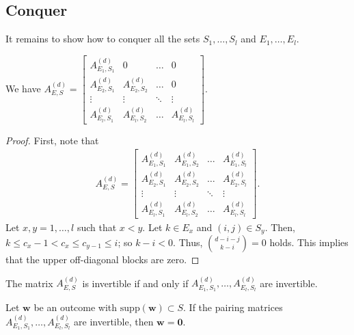 \subsection*{Conquer}

It remains to show how to conquer all the sets \( S_1, \dots, S_l \) and \( E_1, \dots, E_l \).

\begin{proposition}
    We have \( A_{E,S}^{(d)} = 
    \begin{bmatrix}
        A_{E_1,S_1}^{(d)} & 0 & \dots & 0 \\
        A_{E_2,S_1}^{(d)} & A_{E_2,S_2}^{(d)} & \dots & 0 \\
        \vdots & \vdots & \ddots & \vdots \\
        A_{E_l,S_1}^{(d)} & A_{E_l,S_2}^{(d)} & \dots & A_{E_l,S_l}^{(d)}
    \end{bmatrix} \).
\end{proposition}

\begin{proof}
    First, note that 
    \begin{align*}
        A_{E,S}^{(d)} = 
        \begin{bmatrix}
            A_{E_1,S_1}^{(d)} & A_{E_1,S_2}^{(d)} & \dots & A_{E_1,S_l}^{(d)} \\
            A_{E_2,S_1}^{(d)} & A_{E_2,S_2}^{(d)} & \dots & A_{E_2,S_l}^{(d)} \\
            \vdots & \vdots & \ddots & \vdots \\
            A_{E_l,S_1}^{(d)} & A_{E_l,S_2}^{(d)} & \dots & A_{E_l,S_l}^{(d)}
        \end{bmatrix}.
    \end{align*}
    Let \( x,y = 1, \dots , l \) such that \( x < y \). Let \( k \in E_x \) and \( (i,j) \in S_y \).
    Then, \( k \leq c_x - 1 < c_x \leq c_{y - 1} \leq i \); so \( k - i < 0 \). Thus, \( \binom{d-i-j}{k-i} = 0 \) holds. This implies that the upper off-diagonal blocks are zero.
\end{proof}

\begin{corollary}
    The matrix \( A^{(d)}_{E,S} \) is invertible if and only if \( A^{(d)}_{E_1,S_1}, \dots,  A^{(d)}_{E_l,S_l} \) are invertible.
\end{corollary}

\begin{corollary}
    Let \( \mathbf{w} \) be an outcome with \( \mathrm{supp}(\mathbf w) \subset S \).
    If the pairing matrices \( A^{(d)}_{E_1,S_1}, \dots,  A^{(d)}_{E_l,S_l} \) are invertible, then \( \mathbf{w} = \mathbf 0 \).
\end{corollary}

